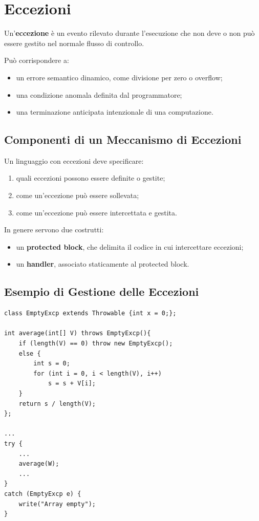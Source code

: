 \documentclass{article}
\begin{document}
\section{Eccezioni}

Un'\textbf{eccezione} è un evento rilevato durante l'esecuzione che non deve o non può essere gestito nel normale flusso di controllo.

Può corrispondere a:
\begin{itemize}
  \item un errore semantico dinamico, come divisione per zero o overflow;
  \item una condizione anomala definita dal programmatore;
  \item una terminazione anticipata intenzionale di una computazione.
\end{itemize}

\subsection{Componenti di un Meccanismo di Eccezioni}

Un linguaggio con eccezioni deve specificare:
\begin{enumerate}
  \item quali eccezioni possono essere definite o gestite;
  \item come un'eccezione può essere sollevata;
  \item come un'eccezione può essere intercettata e gestita.
\end{enumerate}

In genere servono due costrutti:
\begin{itemize}
  \item un \textbf{protected block}, che delimita il codice in cui intercettare eccezioni;
  \item un \textbf{handler}, associato staticamente al protected block.
\end{itemize}

\subsection{Esempio di Gestione delle Eccezioni}

\begin{lstlisting}
class EmptyExcp extends Throwable {int x = 0;};

int average(int[] V) throws EmptyExcp(){
    if (length(V) == 0) throw new EmptyExcp();
    else {
        int s = 0;
        for (int i = 0, i < length(V), i++)
            s = s + V[i];
    }
    return s / length(V);
};

...
try {
    ...
    average(W);
    ...
}
catch (EmptyExcp e) {
    write("Array empty");
}
\end{lstlisting}
\end{document}
